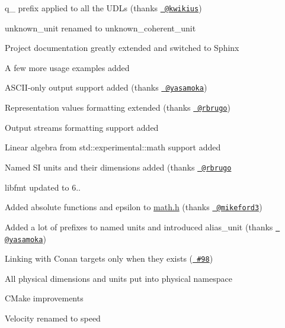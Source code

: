 \begin{DoxyItemize}
\begin{DoxyItemize}
\item {\ttfamily q\+\_\+} prefix applied to all the UDLs (thanks \href{https://github.com/kwikius}{\texttt{ @kwikius}})
\item {\ttfamily unknown\+\_\+unit} renamed to {\ttfamily unknown\+\_\+coherent\+\_\+unit}
\item Project documentation greatly extended and switched to Sphinx
\item A few more usage examples added
\item ASCII-\/only output support added (thanks \href{https://github.com/yasamoka}{\texttt{ @yasamoka}})
\item Representation values formatting extended (thanks \href{https://github.com/rbrugo}{\texttt{ @rbrugo}})
\item Output streams formatting support added
\item Linear algebra from {\ttfamily std\+::experimental\+::math} support added
\item Named SI units and their dimensions added (thanks \href{https://github.com/rbrugo}{\texttt{ @rbrugo}}
\item libfmt updated to 6..
\item Added absolute functions and epsilon to \mbox{\hyperlink{math_8h_source}{math.\+h}} (thanks \href{https://github.com/mikeford3}{\texttt{ @mikeford3}})
\item Added a lot of prefixes to named units and introduced {\ttfamily alias\+\_\+unit} (thanks \href{https://github.com/yasamoka}{\texttt{ @yasamoka}})
\item Linking with Conan targets only when they exists (\href{https://github.com/mpusz/units/issues/98}{\texttt{ \#98}})
\item All physical dimensions and units put into {\ttfamily physical} namespace
\item CMake improvements
\item Velocity renamed to speed
\end{DoxyItemize}


\end{DoxyItemize}
